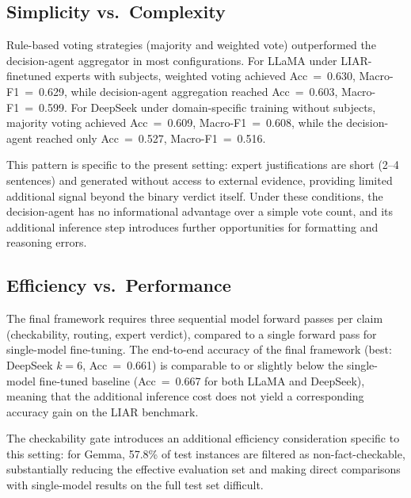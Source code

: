 \subsection{Simplicity vs.\ Complexity}

Rule-based voting strategies (majority and weighted vote) outperformed the decision-agent aggregator in most configurations. For LLaMA under LIAR-finetuned experts with subjects, weighted voting achieved Acc~=~0.630, Macro-F1~=~0.629, while decision-agent aggregation reached Acc~=~0.603, Macro-F1~=~0.599. For DeepSeek under domain-specific training without subjects, majority voting achieved Acc~=~0.609, Macro-F1~=~0.608, while the decision-agent reached only Acc~=~0.527, Macro-F1~=~0.516.

This pattern is specific to the present setting: expert justifications are short (2--4 sentences) and generated without access to external evidence, providing limited additional signal beyond the binary verdict itself. Under these conditions, the decision-agent has no informational advantage over a simple vote count, and its additional inference step introduces further opportunities for formatting and reasoning errors.

\subsection{Efficiency vs.\ Performance}

The final framework requires three sequential model forward passes per claim (checkability, routing, expert verdict), compared to a 
single forward pass for single-model fine-tuning. The end-to-end accuracy of the final framework (best: DeepSeek $k{=}6$, 
Acc~=~0.661) is comparable to or slightly below the single-model fine-tuned baseline (Acc~=~0.667 for both LLaMA and DeepSeek), 
meaning that the additional inference cost does not yield a corresponding accuracy gain on the LIAR benchmark.

The checkability gate introduces an additional efficiency consideration specific to this setting: for Gemma, 57.8\% of test 
instances are filtered as non-fact-checkable, substantially reducing the effective evaluation set and making direct comparisons with 
single-model results on the full test set difficult.